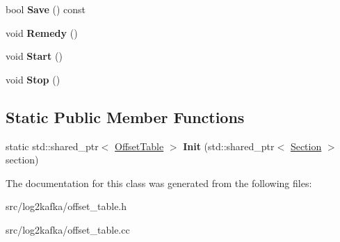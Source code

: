 \begin{DoxyCompactItemize}
\item 
bool {\bfseries Save} () const \hypertarget{classlog2hdfs_1_1OffsetTable_a20f5c9bedffacfe44ad73aacb878b292}{}\label{classlog2hdfs_1_1OffsetTable_a20f5c9bedffacfe44ad73aacb878b292}

\item 
void {\bfseries Remedy} ()\hypertarget{classlog2hdfs_1_1OffsetTable_acdb222d4b547b447aacc7f098b209671}{}\label{classlog2hdfs_1_1OffsetTable_acdb222d4b547b447aacc7f098b209671}

\item 
void {\bfseries Start} ()\hypertarget{classlog2hdfs_1_1OffsetTable_a6aa050e79c6652acd0ea7ddd4cb15d3e}{}\label{classlog2hdfs_1_1OffsetTable_a6aa050e79c6652acd0ea7ddd4cb15d3e}

\item 
void {\bfseries Stop} ()\hypertarget{classlog2hdfs_1_1OffsetTable_ab0a366115afe02ab958f863809b18577}{}\label{classlog2hdfs_1_1OffsetTable_ab0a366115afe02ab958f863809b18577}

\end{DoxyCompactItemize}
\subsection*{Static Public Member Functions}
\begin{DoxyCompactItemize}
\item 
static std\+::shared\+\_\+ptr$<$ \hyperlink{classlog2hdfs_1_1OffsetTable}{Offset\+Table} $>$ {\bfseries Init} (std\+::shared\+\_\+ptr$<$ \hyperlink{classlog2hdfs_1_1Section}{Section} $>$ section)\hypertarget{classlog2hdfs_1_1OffsetTable_ab2a7a4e0e6262160a3f586222e80ea32}{}\label{classlog2hdfs_1_1OffsetTable_ab2a7a4e0e6262160a3f586222e80ea32}

\end{DoxyCompactItemize}


The documentation for this class was generated from the following files\+:\begin{DoxyCompactItemize}
\item 
src/log2kafka/offset\+\_\+table.\+h\item 
src/log2kafka/offset\+\_\+table.\+cc\end{DoxyCompactItemize}
